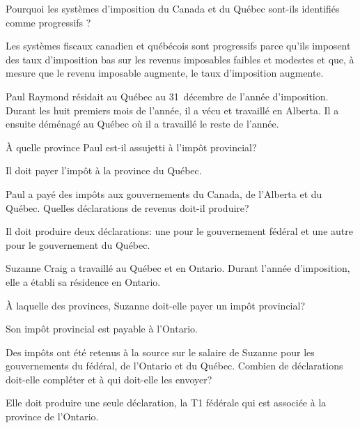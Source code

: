 \begin{question}
	Pourquoi les systèmes d'imposition du Canada et du Québec sont-ils identifiés comme \og progressifs \fg{}?
\end{question}
Les systèmes fiscaux canadien et québécois sont \og progressifs\fg{} parce qu'ils imposent des taux d'imposition bas sur les revenus imposables faibles et modestes et que, à mesure que le revenu imposable augmente, le taux d'imposition augmente.

\begin{question}
	Paul Raymond résidait au Québec au 31~décembre de l'année d'imposition. Durant les huit premiers mois de l'année, il a vécu et travaillé en Alberta. Il a ensuite déménagé au Québec où il a travaillé le reste de l'année.
\end{question}
\setcounter{sousQuestion}{0}
\begin{sousQuestion}
	À quelle province Paul est-il assujetti à l'impôt provincial?
\end{sousQuestion}
Il doit payer l'impôt à la province du Québec.
\begin{sousQuestion}
	Paul a payé des impôts aux gouvernements du Canada, de l'Alberta et du Québec. Quelles déclarations de revenus doit-il produire?
\end{sousQuestion}
Il doit produire deux déclarations: une pour le gouvernement fédéral et une autre pour le gouvernement du Québec.

\begin{question}
	Suzanne Craig a travaillé au Québec et en Ontario. Durant l'année d'imposition, elle a établi sa résidence en Ontario.
\end{question}
\setcounter{sousQuestion}{0}
\begin{sousQuestion}
	À laquelle des provinces, Suzanne doit-elle payer un impôt provincial?
\end{sousQuestion}
Son impôt provincial est payable à l'Ontario.
\begin{sousQuestion}
	Des impôts ont été retenus à la source sur le salaire de Suzanne pour les gouvernements du fédéral, de l'Ontario et du Québec. Combien de déclarations doit-elle compléter et à qui doit-elle les envoyer?
\end{sousQuestion}
Elle doit produire une seule déclaration, la T1 fédérale qui est associée à la province de l'Ontario.



